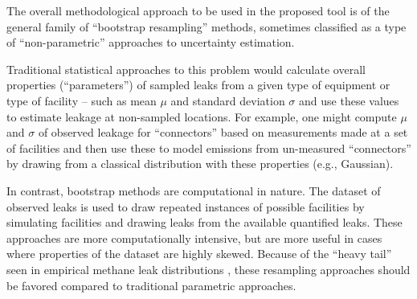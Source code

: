 \documentclass[11pt]{report}
\begin{document}
{{{{The overall methodological approach to be used in the proposed tool is of the general family of ``bootstrap resampling'' methods, sometimes classified as a type of ``non-parametric'' approaches to uncertainty estimation. 

Traditional statistical approaches to this problem would calculate overall properties (``parameters'') of sampled leaks from a given type of equipment or type of facility -- such as mean $\mu$ and standard deviation $\sigma$ and use these values to estimate leakage at non-sampled locations. For example, one might compute $\mu$ and $\sigma$ of observed leakage for ``connectors'' based on measurements made at a set of facilities and then use these to model emissions from un-measured ``connectors'' by drawing from a classical distribution with these properties (e.g., Gaussian).

In contrast, bootstrap methods are computational in nature. The dataset of observed leaks is used to draw repeated instances of possible facilities by simulating facilities and drawing leaks from the available quantified leaks. These approaches are more computationally intensive, but are more useful in cases where properties of the dataset are highly skewed. Because of the ``heavy tail'' seen in empirical methane leak distributions \cite{Brandt2016}, these resampling approaches should be favored compared to traditional parametric approaches.

}}}}
\end{document}
